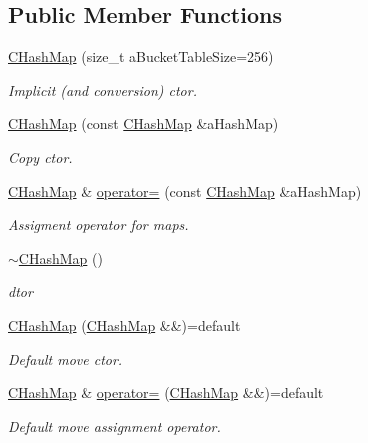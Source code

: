 \subsection*{Public Member Functions}
\begin{DoxyCompactItemize}
\item 
\hyperlink{class_c_hash_map_a40555c434d29ed0942ad03d41df3596d}{C\+Hash\+Map} (size\+\_\+t a\+Bucket\+Table\+Size=256)
\begin{DoxyCompactList}\small\item\em Implicit (and conversion) c\textquotesingle{}tor. \end{DoxyCompactList}\item 
\hyperlink{class_c_hash_map_afe589de62e80dde1ecf3fb606ce1a71f}{C\+Hash\+Map} (const \hyperlink{class_c_hash_map}{C\+Hash\+Map} \&a\+Hash\+Map)
\begin{DoxyCompactList}\small\item\em Copy c\textquotesingle{}tor. \end{DoxyCompactList}\item 
\hyperlink{class_c_hash_map}{C\+Hash\+Map} \& \hyperlink{class_c_hash_map_ac7b55d10283947ce6c4f0a7e73a0f80f}{operator=} (const \hyperlink{class_c_hash_map}{C\+Hash\+Map} \&a\+Hash\+Map)
\begin{DoxyCompactList}\small\item\em Assigment operator for maps. \end{DoxyCompactList}\item 
\hyperlink{class_c_hash_map_a74397f8f7751a170e3712d680a86de75}{$\sim$\+C\+Hash\+Map} ()
\begin{DoxyCompactList}\small\item\em d\textquotesingle{}tor \end{DoxyCompactList}\item 
\hyperlink{class_c_hash_map_a6640595075ccee64690e0ecaf9b4d4be}{C\+Hash\+Map} (\hyperlink{class_c_hash_map}{C\+Hash\+Map} \&\&)=default
\begin{DoxyCompactList}\small\item\em Default move c\textquotesingle{}tor. \end{DoxyCompactList}\item 
\hyperlink{class_c_hash_map}{C\+Hash\+Map} \& \hyperlink{class_c_hash_map_a3b494fb820ecd54937c05023fc67c564}{operator=} (\hyperlink{class_c_hash_map}{C\+Hash\+Map} \&\&)=default
\begin{DoxyCompactList}\small\item\em Default move assignment operator. \end{DoxyCompactList}\item 

\end{DoxyCompactItemize}
